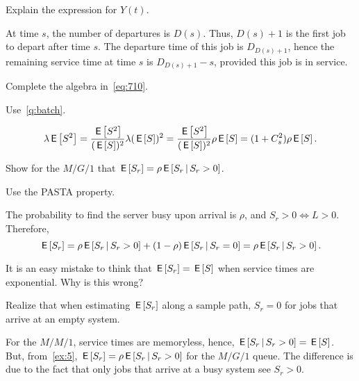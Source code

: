 \begin{exercise}\label{ex:13}
Explain the expression for $Y(t)$.
\begin{solution}
 At time $s$, the number of departures is $D(s)$.
 Thus, $D(s)+1$ is the first job to depart after time $s$.
 The departure time of this job is $D_{D(s)+1}$, hence the remaining service time at time $s$ is $D_{D(s)+1}-s$, provided this job is in service.
\end{solution}
\end{exercise}


\begin{exercise}\label{ex:65}
Complete the algebra in~\cref{eq:710}. 
\begin{hint}
  Use~\cref{q:batch}. 
\end{hint}
\begin{solution}
\begin{equation*}
 \lambda\,\mathsf{E}\left[S^2\right] = \frac{\,\mathsf{E}\left[S^2\right]}{(\,\mathsf{E}\left[S\right])^2} \lambda(\,\mathsf{E}\left[S\right])^2=
 \frac{\,\mathsf{E}\left[S^2\right]}{(\,\mathsf{E}\left[S\right])^2} \rho \,\mathsf{E}\left[S\right] = (1+C_s^2) \rho \,\mathsf{E}\left[S\right].
\end{equation*}
\end{solution}
\end{exercise}




\begin{exercise}\label{ex:5}
Show for the $M/G/1$ that $\,\mathsf{E}\left[S_r\right] = \rho \,\mathsf{E}\left[S_r\,\middle|\, S_r>0\right]$.
\begin{hint}
Use the PASTA property.%
\end{hint}
\begin{solution}
 The probability to find the server busy upon arrival is $\rho$, and $S_r>0 \iff L>0$. Therefore,
\begin{equation*}
\,\mathsf{E}\left[S_r\right] = \rho \,\mathsf{E}\left[S_r\,\middle|\, S_r >0\right] + (1-\rho) \,\mathsf{E}\left[S_r\,\middle|\, S_r = 0\right] = \rho \,\mathsf{E}\left[S_r\,\middle|\, S_r>0\right].
\end{equation*}
\end{solution}
\end{exercise}

\begin{exercise}
 It is an easy mistake to think that $\,\mathsf{E}\left[S_r\right] = \,\mathsf{E}\left[S\right]$ when service
 times are exponential. Why is this wrong?
\begin{hint}
  Realize that when estimating $\,\mathsf{E}\left[S_r\right]$ along a sample path, $S_r=0$ for jobs that arrive at an empty system.
\end{hint}
\begin{solution}
  For the $M/M/1$, service times are memoryless, hence, $\,\mathsf{E}\left[S_r \,\middle|\, S_r>0\right] = \,\mathsf{E}\left[S\right]$.
  But, from~\cref{ex:5}, $\,\mathsf{E}\left[S_r\right] = \rho \,\mathsf{E}\left[S_r \,\middle|\, S_r>0\right]$ for the $M/G/1$ queue.
  The difference is due to the fact that only jobs that arrive at  a busy system see $S_r>0$.
\end{solution}
\end{exercise}



